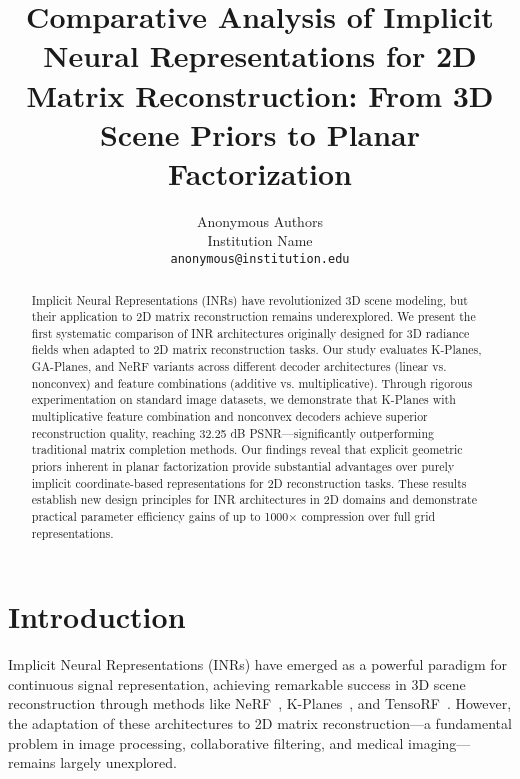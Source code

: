 \documentclass[10pt,twocolumn,letterpaper]{article}
\begin{document}
\title{Comparative Analysis of Implicit Neural Representations for 2D Matrix Reconstruction: From 3D Scene Priors to Planar Factorization}

\author{Anonymous Authors\\
Institution Name\\
{\tt\small anonymous@institution.edu}
}

\maketitle

\begin{abstract}
Implicit Neural Representations (INRs) have revolutionized 3D scene modeling, but their application to 2D matrix reconstruction remains underexplored. We present the first systematic comparison of INR architectures originally designed for 3D radiance fields when adapted to 2D matrix reconstruction tasks. Our study evaluates K-Planes, GA-Planes, and NeRF variants across different decoder architectures (linear vs. nonconvex) and feature combinations (additive vs. multiplicative). Through rigorous experimentation on standard image datasets, we demonstrate that K-Planes with multiplicative feature combination and nonconvex decoders achieve superior reconstruction quality, reaching 32.25 dB PSNR—significantly outperforming traditional matrix completion methods. Our findings reveal that explicit geometric priors inherent in planar factorization provide substantial advantages over purely implicit coordinate-based representations for 2D reconstruction tasks. These results establish new design principles for INR architectures in 2D domains and demonstrate practical parameter efficiency gains of up to 1000× compression over full grid representations.
\end{abstract}

\section{Introduction}

Implicit Neural Representations (INRs) have emerged as a powerful paradigm for continuous signal representation, achieving remarkable success in 3D scene reconstruction through methods like NeRF~\cite{mildenhall2020nerf}, K-Planes~\cite{fridovich2023kplanes}, and TensoRF~\cite{chen2022tensorf}. However, the adaptation of these architectures to 2D matrix reconstruction—a fundamental problem in image processing, collaborative filtering, and medical imaging—remains largely unexplored.
\end{document}
